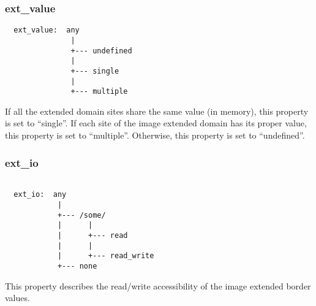 

\subsubsection{ext\_value}

\begin{verbatim}
  ext_value:  any
               |
               +--- undefined
               |
               +--- single
               |
               +--- multiple
\end{verbatim}

If all the extended domain sites share the same value (in memory), this property
is set to ``single''.
If each site of the image extended domain has its proper value, this property
is set to ``multiple''.
Otherwise, this property is set to ``undefined''.


\subsubsection{ext\_io}

\begin{verbatim}

  ext_io:  any
            |
            +--- /some/
            |      |
            |      +--- read
            |      |
            |      +--- read_write
            +--- none
\end{verbatim}

This property describes  the read/write accessibility of the image extended
border values.
